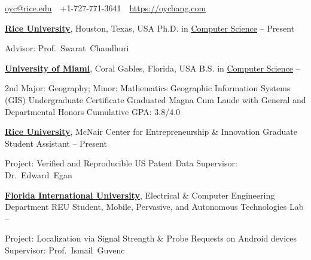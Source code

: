 \documentclass[letterpaper,MMMyyyy,nonstopmode]{simpleresumecv}
\newcommand{\CVAuthor}{Oliver Chang}
\newcommand{\CVWebpage}{https://oychang.com}
\begin{document}

\Title{\CVAuthor}

\begin{SubTitle}
\href{mailto:oyc@rice.edu}{oyc@rice.edu}
\,\SubBulletSymbol\,
+1-727-771-3641
\,\SubBulletSymbol\,
\href{\CVWebpage}
{\url{\CVWebpage}}
\end{SubTitle}

\begin{Body}



\Entry
\href{http://www.rice.edu/}{\textbf{Rice University}},
Houston, Texas, USA
\Gap
\BulletItem
Ph.D. in \href{http://www.cs.rice.edu/}{Computer Science}
\hfill
{} -- Present
\begin{Detail}
\SubBulletItem Advisor: Prof.~Swarat~Chaudhuri
\end{Detail}

\BigGap

\Entry
\href{http://welcome.miami.edu/}{\textbf{University of Miami}},
Coral Gables, Florida, USA
\Gap
\BulletItem
B.S. in \href{http://www.as.miami.edu/csc/}{Computer Science}
\hfill
{} -- 
\begin{Detail}
\SubBulletItem 2nd Major: Geography; Minor: Mathematics
\SubBulletItem Geographic Information Systems (GIS) Undergraduate Certificate
\SubBulletItem Graduated Magna Cum Laude with General and Departmental Honors
\SubBulletItem Cumulative GPA: 3.8/4.0
\end{Detail}



\Entry
\href{http://www.rice.edu/}{\textbf{Rice University}}, McNair Center for Entrepreneurship \& Innovation
\Gap
\BulletItem Graduate Student Assistant
\hfill {} -- Present
\begin{Detail}
\SubBulletItem
Project: Verified and Reproducible US Patent Data
\SubBulletItem
Supervisor: Dr.~Edward~Egan
\end{Detail}

\Entry
\href{http://www.fiu.edu/}{\textbf{Florida International University}}, Electrical \& Computer Engineering Department
\Gap
\BulletItem REU Student, Mobile, Pervasive, and Autonomous Technologies Lab
\hfill {} -- 
\begin{Detail}
\SubBulletItem
Project: Localization via Signal Strength \& Probe Requests on Android devices
\SubBulletItem
Supervisor: Prof.~Ismail~Guvenc
\end{Detail}


\end{Body}
\end{document}
